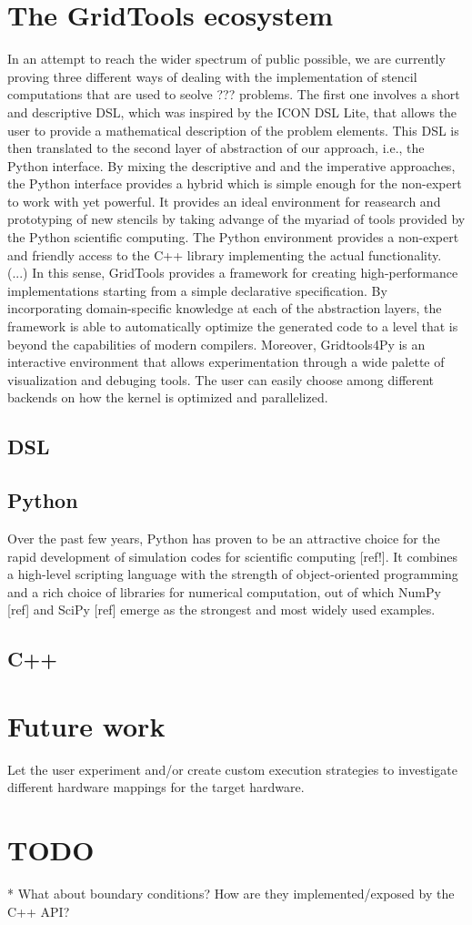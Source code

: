 \documentclass[english]{article}
\begin{document}
\section{The GridTools ecosystem}
In an attempt to reach the wider spectrum of public possible, we are currently proving three different ways of dealing with the implementation of stencil computations that are used to seolve ??? problems.
The first one involves a short and descriptive DSL, which was inspired by the ICON DSL Lite, that allows the user to provide a mathematical description of the problem elements.
This DSL is then translated to the second layer of abstraction of our approach, i.e., the Python interface.
By mixing the descriptive and and the imperative approaches, the Python interface provides a hybrid which is simple enough for the non-expert to work with yet powerful.
It provides an ideal environment for reasearch and prototyping of new stencils by taking advange of the myariad of tools provided by the Python scientific computing.
The Python environment provides a non-expert and friendly access to the C++ library implementing the actual functionality.
(...)
In this sense, GridTools provides a framework for creating high-performance implementations starting from a simple declarative specification. 
By incorporating domain-specific knowledge at each of the abstraction layers, the framework is able to automatically optimize the generated code to a level that is beyond the capabilities of modern compilers.
Moreover, Gridtools4Py is an interactive environment that allows experimentation through a wide palette of visualization and debuging tools.
The user can easily choose among different backends on how the kernel is optimized and parallelized.

\subsection{DSL}

\subsection{Python}
Over the past few years, Python has proven to be an attractive choice for the rapid development of simulation codes for scientific computing [ref!].
It combines a high-level scripting language with the strength of object-oriented programming and a rich choice of libraries for numerical computation, out of which NumPy [ref] and SciPy [ref] emerge as the strongest and most widely used examples.

\subsection{C++}

\section{Future work}
Let the user experiment and/or create custom execution strategies to investigate different hardware mappings for the target hardware.

\section{TODO}
* What about boundary conditions? How are they implemented/exposed by the C++ API?
\end{document}
